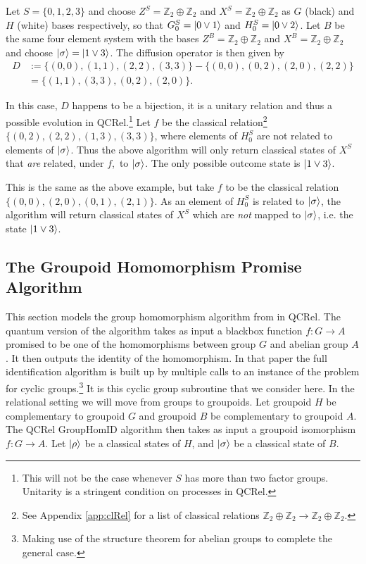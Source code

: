 \begin{example}
Let $S=\{0,1,2,3\}$ and choose $Z^S=\mathbb{Z}_2\oplus\mathbb{Z}_2$ and $X^S=\mathbb{Z}_2\oplus\mathbb{Z}_2$ as $G$ (black) and $H$ (white) bases respectively, so that $G^{S}_0=| 0\vee 1 \rangle$ and $H^S_0 = | 0\vee 2 \rangle$. Let $B$ be the same four element system with the bases $Z^B=\mathbb{Z}_2\oplus\mathbb{Z}_2$ and $X^B=\mathbb{Z}_2\oplus\mathbb{Z}_2$ and choose $| \sigma \rangle=| 1\vee 3 \rangle$. The diffusion operator is then given by
\begin{align*}
D &:= \{(0,0),(1,1),(2,2),(3,3)\}-\{(0,0),(0,2),(2,0),(2,2)\}
\\&=\{(1,1),(3,3),(0,2),(2,0)\}.
\end{align*}

In this case, $D$ happens to be a bijection, it is a unitary relation and thus a possible evolution in QCRel.\footnote{This will not be the case whenever $S$ has more than two factor groups. Unitarity is a stringent condition on processes in QCRel.} Let $f$ be the classical relation\footnote{See Appendix \ref{app:clRel} for a list of classical relations $\mathbb{Z}_2\oplus\mathbb{Z}_2\to\mathbb{Z}_2\oplus\mathbb{Z}_2$.} $\{(0,2),(2,2),(1,3),(3,3)\}$, where elements of $H^S_0$ are not related to elements of $| \sigma \rangle$. Thus the above algorithm will only return classical states of $X^{S}$ that \textit{are} related, under $f$,\ to $| \sigma \rangle$.  The only possible outcome state is $| 1\vee 3 \rangle$.
\end{example}

\begin{example}
This is the same as the above example, but take $f$ to be the classical relation $\{(0,0),(2,0),(0,1),(2,1)\}$. As an element of $H^S_0$ is related to $| \sigma \rangle$, the algorithm will return classical states of $X^S$ which are \emph{not} mapped to $| \sigma \rangle$, i.e. the state $| 1\vee3 \rangle$.
\end{example}

\subsection{The Groupoid Homomorphism Promise Algorithm}

This section models the group homomorphism algorithm from \cite{zeng2014abstract} in QCRel.  The quantum version of the algorithm takes as input a blackbox function $f:G\to A$ promised to be one of the homomorphisms between group $G$ and abelian group $A$.  It then outputs the identity of the homomorphism. In that paper the full identification algorithm is built up by multiple calls to an instance of the problem for cyclic groups.\footnote{Making use of the structure theorem for abelian groups to complete the general case.} It is this cyclic group subroutine that we consider here. In the relational setting we will move from groups to groupoids. Let groupoid $H$ be complementary to groupoid $G$ and groupoid $B$ be complementary to groupoid $A$. The QCRel GroupHomID algorithm then takes as input a groupoid isomorphism $f:G\to A$.   Let $| \rho \rangle$ be a classical states of $H$, and $| \sigma \rangle$ be a classical state of $B$. 

